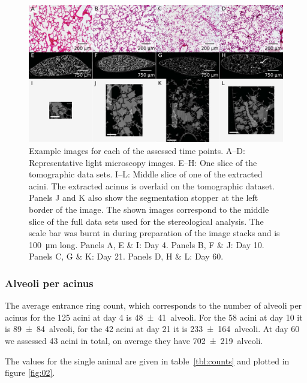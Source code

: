 \documentclass[
  american,
]{article}
\begin{document}
\begin{figure}
\hypertarget{fig:01}{%
\centering
\includegraphics{images/fig01.png}
\caption{Example images for each of the assessed time points.
A--D: Representative light microscopy images.
E--H: One slice of the tomographic data sets.
I--L: Middle slice of one of the extracted acini.
The extracted acinus is overlaid on the tomographic dataset.
Panels J and K also show the segmentation stopper at the left border of the image.
The shown images correspond to the middle slice of the full data sets used for the stereological analysis.
The scale bar was burnt in during preparation of the image stacks and is 100~μm long.
Panels A, E \& I: Day 4.
Panels B, F \& J: Day 10.
Panels C, G \& K: Day 21.
Panels D, H \& L: Day 60.}\label{fig:01}
}
\end{figure}

\hypertarget{alveoli-per-acinus}{%
\subsubsection{Alveoli per acinus}\label{alveoli-per-acinus}}

The average entrance ring count, which corresponds to the number of alveoli per acinus for the 125 acini at day 4 is 48~±~41~alveoli.
For the 58 acini at day 10 it is 89~±~84~alveoli, for the 42 acini at day 21 it is 233~±~164~alveoli.
At day 60 we assessed 43 acini in total, on average they have 702~±~219~alveoli.

The values for the single animal are given in table~\ref{tbl:counts} and plotted in figure \ref{fig:02}.
\end{document}
